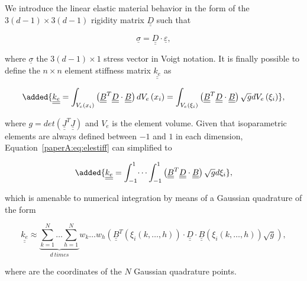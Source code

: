 We introduce the linear elastic material behavior in the form of the $3\left(d-1\right)\times 3\left(d-1\right)$ rigidity matrix $\underline{\underline{D}}$ such that

\begin{equation}
\underline{\sigma}=\underline{\underline{D}}\cdot\underline{\varepsilon},
\end{equation}

where $\underline{\sigma}$ the $3\left(d-1\right)\times 1$ stress vector in Voigt notation. It is finally possible to define the $n\times n$ element stiffness matrix $\underline{\underline{k_{e}}}$ as

\begin{equation}\label{paperA:eq:elestiff}
\added{\underline{\underline{k_{e}}}=\int_{V_{e}\left(x_{i}\right)}\left(\underline{\underline{B}}^{T}\underline{\underline{D}}\cdot\underline{\underline{B}}\right)dV_{e}\left(x_{i}\right)=\int_{V_{e}\left(\xi_{i}\right)}\left(\underline{\underline{B}}^{T}\underline{\underline{D}}\cdot\underline{\underline{B}}\right)\sqrt{g}dV_{e}\left(\xi_{i}\right)},
\end{equation}

where $g=det\left(\underline{\underline{J}}^{T}\underline{\underline{J}}\right)$ and $V_{e}$ is the element volume. Given that isoparametric elements are always defined between $-1$ and $1$ in each dimension, Equation~\ref{paperA:eq:elestiff} can simplified to

\begin{equation}
\added{\underline{\underline{k_{e}}}=\int_{-1}^{1}\dots\int_{-1}^{1}\left(\underline{\underline{B}}^{T}\underline{\underline{D}}\cdot\underline{\underline{B}}\right)\sqrt{g}d\xi_{i}},
\end{equation}

which is amenable to numerical integration by means of a Gaussian quadrature of the form

\begin{equation}\label{paperA:eq:elstiffnum}
\underline{\underline{k_{e}}}\approx \underbrace{\sum_{k=1}^{N}\dots\sum_{h=1}^{N}}_{d\ times}w_{k}\dots w_{h}\left(\underline{\underline{B}}^{T}\left(\xi_{i}\left(k, \dots,h\right)\right)\cdot\underline{\underline{D}}\cdot\underline{\underline{B}}\left(\xi_{i}\left(k, \dots,h\right)\right)\sqrt{g}\right),
\end{equation}

where  are the coordinates of the $N$ Gaussian quadrature points. 

